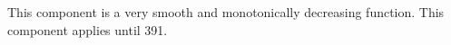 This component is a very smooth and monotonically decreasing function.
This component applies until  391.